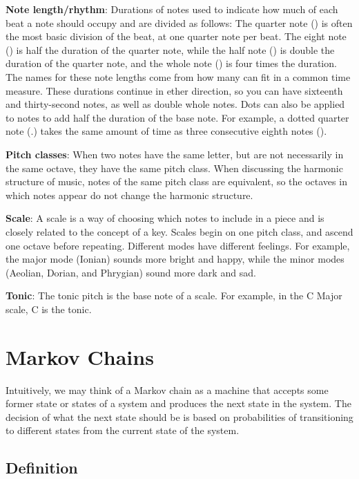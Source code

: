 
\textbf{Note length/rhythm}: Durations of notes used to indicate how much of each beat a note should occupy and are divided as follows:
The quarter note (\quarternote) is often the most basic division of the beat, at one quarter note per beat.
The eight note (\eighthnote) is half the duration of the quarter note, while the half note (\halfnote) is double the duration of the quarter note, and the whole note (\fullnote) is four times the duration.
The names for these note lengths come from how many can fit in a common time measure.
These durations continue in ether direction, so you can have sixteenth and thirty-second notes, as well as double whole notes.
Dots can also be applied to notes to add half the duration of the base note.
For example, a dotted quarter note (\quarternote.) takes the same amount of time as three consecutive eighth notes (\eighthnote \eighthnote \eighthnote).


\textbf{Pitch classes}: When two notes have the same letter, but are not necessarily in the same octave, they have the same pitch class.
When discussing the harmonic structure of music, notes of the same pitch class are equivalent, so the octaves in which notes appear do not change the harmonic structure.

\textbf{Scale}: A scale is a way of choosing which notes to include in a piece and is closely related to the concept of a key.
Scales begin on one pitch class, and ascend one octave before repeating.
Different modes have different feelings.
For example, the major mode (Ionian) sounds more bright and happy, while the minor modes (Aeolian, Dorian, and Phrygian) sound more dark and sad.

\textbf{Tonic}: The tonic pitch is the base note of a scale.
For example, in the C Major scale, C is the tonic.

\section[Markov Chains]{Markov Chains} \label{bg:markov}

Intuitively, we may think of a Markov chain as a machine that accepts some former state or states of a system and produces the next state in the system.
The decision of what the next state should be is based on probabilities of transitioning to different states from the current state of the system.

\subsection{Definition} \label{bg:markov:definitions}

